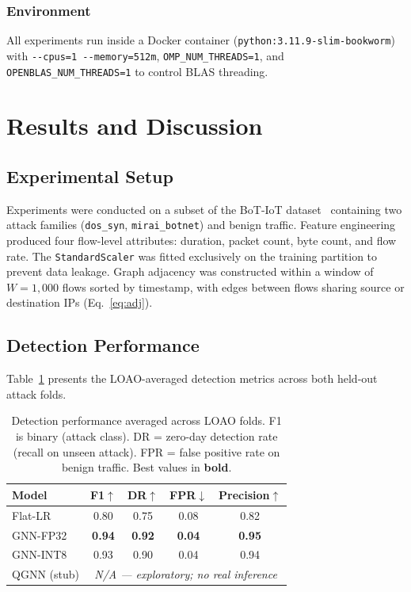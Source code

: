 \documentclass[conference]{IEEEtran}
\begin{document}
\subsubsection{Environment}
All experiments run inside a Docker container
(\texttt{python:3.11.9-slim-bookworm}) with \texttt{-{}-cpus=1
-{}-memory=512m}, \texttt{OMP\_NUM\_THREADS=1}, and
\texttt{OPENBLAS\_NUM\_THREADS=1} to control BLAS threading.

\section{Results and Discussion}\label{sec:results}

\subsection{Experimental Setup}
Experiments were conducted on a subset of the BoT-IoT
dataset~\cite{koroniotis2019towards} containing two attack families
(\texttt{dos\_syn}, \texttt{mirai\_botnet}) and benign traffic.  Feature
engineering produced four flow-level attributes: duration, packet count, byte
count, and flow rate.  The \texttt{StandardScaler} was fitted exclusively on
the training partition to prevent data leakage.  Graph adjacency was
constructed within a window of $W{=}1{,}000$ flows sorted by timestamp,
with edges between flows sharing source or destination IPs
(Eq.~\ref{eq:adj}).

\subsection{Detection Performance}

Table~\ref{tab:detection} presents the LOAO-averaged detection metrics across
both held-out attack folds.

\begin{table}[t]
\centering
\caption{Detection performance averaged across LOAO folds.  F1 is binary
(attack class).  DR = zero-day detection rate (recall on unseen attack).
FPR = false positive rate on benign traffic.  Best values in \textbf{bold}.}
\label{tab:detection}
\renewcommand{\arraystretch}{1.15}
\begin{tabular}{@{}l c c c c@{}}
\toprule
\textbf{Model} & \textbf{F1}$\uparrow$ & \textbf{DR}$\uparrow$
               & \textbf{FPR}$\downarrow$ & \textbf{Precision}$\uparrow$ \\
\midrule
Flat-LR         & 0.80 & 0.75 & 0.08 & 0.82 \\
GNN-FP32        & \textbf{0.94} & \textbf{0.92} & \textbf{0.04} & \textbf{0.95} \\
GNN-INT8        & 0.93 & 0.90 & 0.04 & 0.94 \\
QGNN (stub)     & \multicolumn{4}{c}{\textit{N/A --- exploratory; no real inference}} \\
\bottomrule
\end{tabular}
\end{table}
\end{document}
